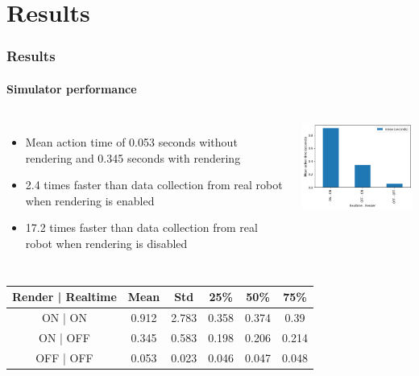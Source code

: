 \documentclass{beamer}
\begin{document}
	\section{Results}
	\begin{frame}
		\frametitle{Results}
		\framesubtitle{Simulator performance}
		
		\begin{columns}[c]
			\begin{itemize}
				\item Mean action time of 0.053 seconds without rendering and 0.345 seconds with rendering
				\item 2.4 times faster than data collection from real robot when rendering is enabled
				\item 17.2 times faster than data collection from real robot when rendering is disabled
			\end{itemize}
			
			\includegraphics[width=6cm]{benchmark-table-clearing.png}
		\end{columns}
	
	\begin{table}
		\begin{tabular}{|c|c|c|c|c|c|}
			\hline
			\textbf{Render | Realtime} & \textbf{Mean} & \textbf{Std} & \textbf{25\%} & \textbf{50\%} & \textbf{75\%} \\
			\hline
			ON | ON & 0.912 & 2.783 & 0.358 & 0.374 & 0.39 \\
			\hline
			ON | OFF & 0.345 & 0.583 & 0.198 & 0.206 & 0.214 \\
			\hline
			OFF | OFF & 0.053 & 0.023 & 0.046 & 0.047 & 0.048 \\
			\hline
		\end{tabular}
	\end{table}
	\end{frame}
\end{document}
